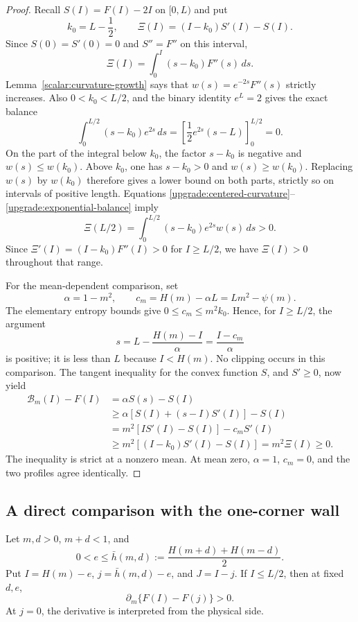 \begin{proof}
Recall $S(I)=F(I)-2I$ on $[0,L)$ and put
\[
 k_0=L-\frac12,\qquad
 \Xi(I)=(I-k_0)S'(I)-S(I).
\]
Since $S(0)=S'(0)=0$ and $S''=F''$ on this interval,
\begin{equation}
 \Xi(I)=\int_0^I(s-k_0)F''(s)\,ds.
 \label{upgrade:centered-curvature}
\end{equation}
Lemma~\ref{scalar:curvature-growth} says that
$w(s)=e^{-2s}F''(s)$ strictly increases. Also
$0<k_0<L/2$, and the binary identity $e^L=2$ gives the exact
balance
\begin{equation}
 \int_0^{L/2}(s-k_0)e^{2s}\,ds
 =\left[\frac12e^{2s}(s-L)\right]_0^{L/2}=0.
 \label{upgrade:exponential-balance}
\end{equation}
On the part of the integral below $k_0$, the factor $s-k_0$ is
negative and $w(s)\le w(k_0)$. Above $k_0$, one has
$s-k_0>0$ and $w(s)\ge w(k_0)$. Replacing $w(s)$ by $w(k_0)$
therefore gives a lower
bound on both parts, strictly so on intervals of positive length.
Equations \eqref{upgrade:centered-curvature}--
\eqref{upgrade:exponential-balance} imply
\[
 \Xi(L/2)
 =\int_0^{L/2}(s-k_0)e^{2s}w(s)\,ds>0.
\]
Since $\Xi'(I)=(I-k_0)F''(I)>0$ for $I\ge L/2$, we have
$\Xi(I)>0$ throughout that range.

For the mean-dependent comparison, set
\[
 \alpha=1-m^2,\qquad
 c_m=H(m)-\alpha L=Lm^2-\psi(m).
\]
The elementary entropy bounds give
$0\le c_m\le m^2k_0$. Hence, for $I\ge L/2$, the argument
\[
 s=L-\frac{H(m)-I}{\alpha}
   =\frac{I-c_m}{\alpha}
\]
is positive; it is less than $L$ because $I<H(m)$. No clipping
occurs in this comparison. The tangent inequality for the convex
function $S$, and $S'\ge0$, now yield
\begin{align*}
 \mathcal B_m(I)-F(I)
 &=\alpha S(s)-S(I)\\
 &\ge\alpha[S(I)+(s-I)S'(I)]-S(I)\\
 &=m^2[IS'(I)-S(I)]-c_mS'(I)\\
 &\ge m^2[(I-k_0)S'(I)-S(I)]
 =m^2\Xi(I)\ge0.
\end{align*}
The inequality is strict at a nonzero mean. At mean zero,
$\alpha=1$, $c_m=0$, and the two profiles agree identically.
\end{proof}

\subsection{A direct comparison with the one-corner wall}

\begin{lemma}
\label{wall:monotonicity}
Let $m,d>0$, $m+d<1$, and
\[
 0<e\le\bar h(m,d):=\frac{H(m+d)+H(m-d)}2.
\]
Put $I=H(m)-e$, $j=\bar h(m,d)-e$, and $J=I-j$. If
$I\le L/2$, then at fixed $d,e$,
\begin{equation}
 \partial_m\{F(I)-F(j)\}>0.
 \label{wall:positive-derivative}
\end{equation}
At $j=0$, the derivative is interpreted from the physical side.
\end{lemma}

